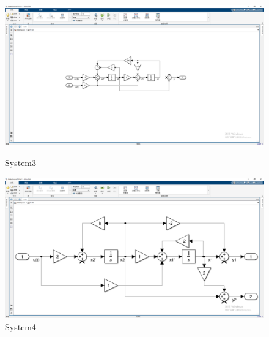 \documentclass[12pt,a4paper,oneside]{ctexart}
\begin{document}
    \begin{figure}[H]
        \includegraphics[height = 0.35\textheight]{../screenshots/MT1S3.PNG}
        \caption{System3}
        \includegraphics[height = 0.35\textheight]{../screenshots/MT1S4.PNG}
        \caption{System4}
    \end{figure}
\end{document}

